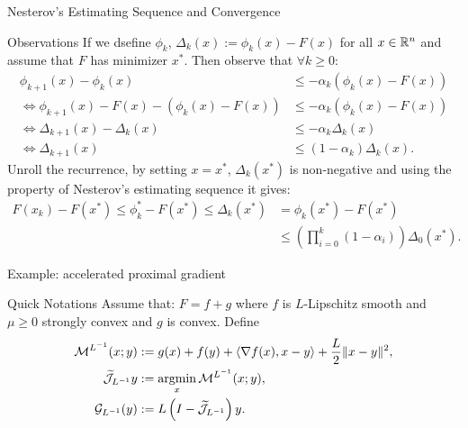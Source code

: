 \documentclass[11pt]{beamer}
\begin{document}
        \begin{frame}{Nesterov's Estimating Sequence and Convergence}
            \begin{block}{Observations}
                {\small
                If we dsefine $\phi_k$, $\Delta_k(x) := \phi_k (x) - F(x)$ for all $x \in \mathbb R^n$ and assume that $F$ has minimizer $x^*$. 
                Then observe that $\forall k \ge 0$:  
                \begin{align*}
                    \phi_{k + 1}(x) - \phi_k(x) 
                    &\le - \alpha_k (\phi_k(x) - F(x))
                    \\
                    \iff 
                    \phi_{k + 1}(x) - F(x) - (\phi_k(x) - F(x))
                    &\le 
                    -\alpha_k(\phi_k(x) - F(x))
                    \\
                    \iff
                    \Delta_{k + 1}(x) - \Delta_k(x) &\le
                    - \alpha_k\Delta_k(x)
                    \\
                    \iff 
                    \Delta_{k + 1}(x) 
                    &\le 
                    (1 - \alpha_k)\Delta_k(x). 
                \end{align*}
                Unroll the recurrence, by setting $x = x^*$, $\Delta_k(x^*)$ is non-negative and using the property of Nesterov's estimating sequence it gives: 
                \begin{align*}
                    F(x_k) - F(x^*) \le \phi_k^* - F(x^*) \le \Delta_k(x^*) 
                    &= \phi_k(x^*) - F(x^*) 
                    \\
                    &\le \left(\prod_{i = 0}^k(1 - \alpha_i)\right)\Delta_0(x^*).
                \end{align*}
                }
            \end{block}
            
        \end{frame}
        \begin{frame}{Example: accelerated proximal gradient}
            \begin{block}{Quick Notations}
                Assume that: $F = f + g$ where $f$ is $L$-Lipschitz smooth and $\mu \ge 0$ strongly convex and $g$ is convex. 
                Define 
                \begin{align*}
                    \mathcal M^{L^{-1}}(x; y) 
                    &:= g(x) + f(y) 
                    + 
                    \left\langle \nabla f(x), x - y\right\rangle 
                    + 
                    \frac{L}{2}\Vert x - y\Vert^2, 
                    \\
                    \widetilde{\mathcal J}_{L^{-1}}y 
                    &:= \mathop{\rm argmin}\limits_{x} \mathcal M^{L^{-1}}(x; y), 
                    \\
                    \mathcal G_{L^{-1}}(y)
                    &:= L\left(I - \widetilde{\mathcal J}_{L^{-1}}\right)y. 
                \end{align*}

            \end{block}
        \end{frame}
\end{document}
